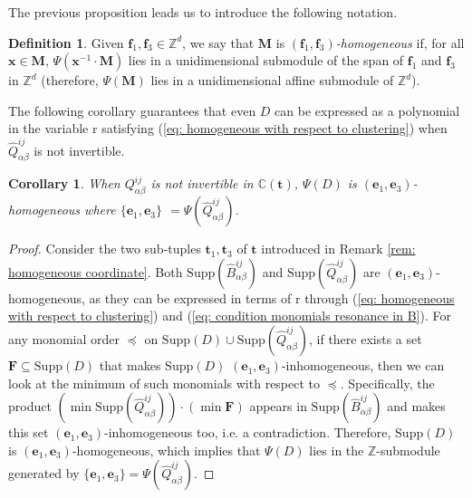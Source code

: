 \documentclass[10pt]{article}
\newtheorem{cor}{Corollary}%
\theoremstyle{remark}%
\theoremstyle{definition}%
\newtheorem{defn}{Definition}%
\begin{document}
The previous proposition leads us to introduce the following notation. 
\begin{defn}
\label{def: coherent and balanced sets}
Given $\mathbf{f}_{1},\mathbf{f}_{3}\in\mathbb{Z}^{d}$, 
we say that $\mathbf{M}$ is  \emph{$(\mathbf{f}_{1},\mathbf{f}_{3})$-homogeneous} if, 
for all $\mathbf{x}\in\mathbf{M}$, $\Psi(\mathbf{x}^{-1}\cdot \mathbf{M})$ lies in a unidimensional submodule of the span of $\mathbf{f}_{1}$ and $\mathbf{f}_{3}$ in $\mathbb{Z}^{d}$ (therefore, $\Psi(\mathbf{M})$ lies in a unidimensional affine submodule of $\mathbb{Z}^{d}$). 
\end{defn}
The following corollary guarantees that even $D$ can be expressed as a polynomial in the variable $\mathrm{r}$ satisfying (\ref{eq: homogeneous with respect to clustering}) when 
$\hat{Q}_{\alpha\beta}^{ij}$ is not invertible. 
\begin{cor}
\label{cor: class-2 D, variables and independence} When $Q_{\alpha\beta}^{ij}$ is not invertible in $\mathbb{C}(\mathbf{t})$, $\Psi(D)$ is $(\mathbf{e}_{1},\mathbf{e}_{3})$-homogeneous where $\{\mathbf{e}_{1},\mathbf{e}_{3}\}$ $=\Psi(\hat{Q}_{\alpha\beta}^{ij})$. 
\end{cor}
\begin{proof}
Consider the two sub-tuples $\mathbf{t}_{1},\mathbf{t}_{3}$
of $\mathbf{t}$ introduced in Remark \ref{rem: homogeneous coordinate}. Both $\mathrm{Supp}(\hat{B}_{\alpha\beta}^{ij})$ and $\mathrm{Supp}(\hat{Q}_{\alpha\beta}^{ij})$ are $(\mathbf{e}_{1},\mathbf{e}_{3})$-homogeneous, as they can be expressed in terms of $\mathrm{r}$ through (\ref{eq: homogeneous with respect to clustering}) and (\ref{eq: condition monomials resonance in B}). For any monomial order $\preceq$ on $\mathrm{Supp}(D)\cup\mathrm{Supp}(\hat{Q}_{\alpha\beta}^{ij})$, if there exists a set $\mathbf{F}\subseteq \mathrm{Supp}(D)$ that makes $\mathrm{Supp}(D)$ $(\mathbf{e}_{1},\mathbf{e}_{3})$-inhomogeneous, then we can look at the minimum of such monomials with respect to $\preceq$. Specifically, the product $(\min\mathrm{Supp}(\hat{Q}_{\alpha\beta}^{ij}))\cdot(\min\mathbf{F})$ appears in $\mathrm{Supp}(\hat{B}_{\alpha\beta}^{ij})$ and makes this set $(\mathbf{e}_{1},\mathbf{e}_{3})$-inhomogeneous too, i.e. a contradiction. Therefore, $\mathrm{Supp}(D)$ is $(\mathbf{e}_{1},\mathbf{e}_{3})$-homogeneous, which implies that $\Psi(D)$ lies in the $\mathbb{Z}$-submodule generated by $\{\mathbf{e}_{1},\mathbf{e}_{3}\}=\Psi(\hat{Q}_{\alpha\beta}^{ij})$. 
\end{proof}
\end{document}
